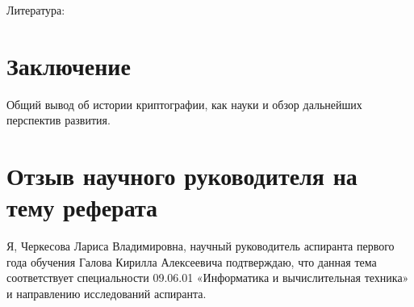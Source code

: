 Литература: \cite{scarani2004quantum, ch1984quantum, lo2005decoy}

\section*{Заключение}
Общий вывод об истории криптографии, как науки и обзор дальнейших перспектив развития.



\clearpage
{}
\section*{Отзыв научного руководителя на тему реферата}
Я, Черкесова Лариса Владимировна, научный руководитель аспиранта первого года обучения Галова Кирилла Алексеевича подтверждаю, что данная тема соответствует специальности 09.06.01 «Информатика и вычислительная техника» и направлению исследований аспиранта.
\bigskip


